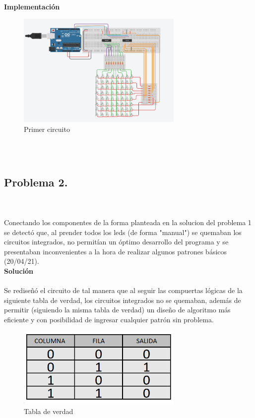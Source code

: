 \documentclass{article}
\begin{document}
\textbf{\large Implementación}\\
\begin{figure}[h]
    \includegraphics[width=8cm]{Imagen1.png}
    \centering
    \caption{Primer circuito}
    \label{fig:Imagen1}
\end{figure}\\\\

\subsection{\large Problema 2.}\\\\
Conectando los componentes de la forma planteada en la solucion del problema 1 se detectó que, al prender todos los leds (de forma "manual") se quemaban los circuitos integrados, no permitían un óptimo desarrollo del programa y se presentaban inconvenientes a la hora de realizar algunos patrones básicos (20/04/21).\\


\textbf{\large Solución}\\\\
Se rediseñó el circuito de tal manera que al seguir las compuertas lógicas de la siguiente tabla de verdad, los circuitos integrados no se quemaban, además de permitir (siguiendo la misma tabla de verdad) un diseño de algoritmo más eficiente y con posibilidad de ingresar cualquier patrón sin problema.\\

\begin{figure}[h]
    \includegraphics[width=8cm]{Tabla de verdad.png}
    \centering
    \caption{Tabla de verdad}
    \label{fig:Tabla de verdad}
\end{figure}\\\\
\end{document}
